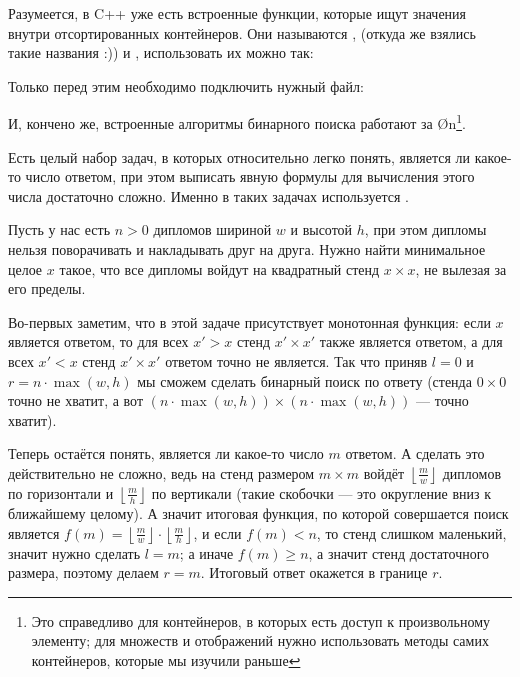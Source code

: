Разумеется, в C++ уже есть встроенные функции, которые ищут значения внутри отсортированных контейнеров. Они называются ,  (откуда же взялись такие названия :)) и , использовать их можно так:


Только перед этим необходимо подключить нужный файл:


И, кончено же, встроенные алгоритмы бинарного поиска работают за \O{\log n}\footnote{Это справедливо для контейнеров, в которых есть доступ к произвольному элементу; для множеств и отображений нужно использовать методы самих контейнеров, которые мы изучили раньше}.


Есть целый набор задач, в которых относительно легко понять, является ли какое-то число ответом, при этом выписать явную формулы для вычисления этого числа достаточно сложно. Именно в таких задачах используется .

Пусть у нас есть $n > 0$ дипломов шириной $w$ и высотой $h$, при этом дипломы нельзя поворачивать и накладывать друг на друга. Нужно найти минимальное целое $x$ такое, что все дипломы войдут на квадратный стенд $x \times x$, не вылезая за его пределы.

Во-первых заметим, что в этой задаче присутствует монотонная функция: если $x$ является ответом, то для всех $x' > x$ стенд $x' \times x'$ также является ответом, а для всех $x' < x$ стенд $x' \times x'$ ответом точно не является. Так что приняв $l=0$ и $r=n \cdot \max(w, h)$ мы сможем сделать бинарный поиск по ответу (стенда $0 \times 0$ точно не хватит, а вот $(n \cdot \max(w, h)) \times (n \cdot \max(w, h))$ — точно хватит).

Теперь остаётся понять, является ли какое-то число $m$ ответом. А сделать это действительно не сложно, ведь на стенд размером $m \times m$ войдёт $\left\lfloor \frac{m}{w} \right\rfloor$ дипломов по горизонтали и $\left\lfloor \frac{m}{h} \right\rfloor$ по вертикали (такие скобочки — это округление вниз к ближайшему целому). А значит итоговая функция, по которой совершается поиск является $f(m) = \left\lfloor \frac{m}{w} \right\rfloor \cdot \left\lfloor \frac{m}{h} \right\rfloor$, и если $f(m) < n$, то стенд слишком маленький, значит нужно сделать $l = m$; а иначе $f(m) \geq n$, а значит стенд достаточного размера, поэтому делаем $r = m$. Итоговый ответ окажется в границе $r$.

